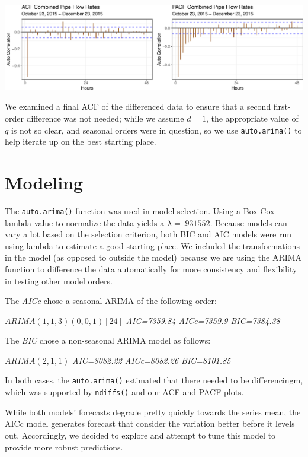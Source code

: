 \documentclass[openany]{book}
\begin{document}
\includegraphics{Group2_Project1_Fall2019_files/figure-latex/unnamed-chunk-18-1.pdf}

We examined a final ACF of the differenced data to ensure that a second
first-order difference was not needed; while we assume \(d = 1\), the
appropriate value of \(q\) is not so clear, and seasonal orders were in
question, so we use \texttt{auto.arima()} to help iterate up on the best
starting place.

\hypertarget{modeling-2}{%
\section{Modeling}\label{modeling-2}}

The \texttt{auto.arima()} function was used in model selection. Using a
Box-Cox lambda value to normalize the data yields a
\(\lambda= .931552\). Because models can vary a lot based on the
selection criterion, both BIC and AIC models were run using lambda to
estimate a good starting place. We included the transformations in the
model (as opposed to outside the model) because we are using the ARIMA
function to difference the data automatically for more consistency and
flexibility in testing other model orders.

The \emph{AICc} chose a seasonal ARIMA of the following order:

\(ARIMA(1,1,3)(0,0,1)[24]\) \emph{AIC=7359.84 AICc=7359.9 BIC=7384.38}

The \emph{BIC} chose a non-seasonal ARIMA model as follows:

\(ARIMA(2,1,1)\) \emph{AIC=8082.22 AICc=8082.26 BIC=8101.85}

In both cases, the \texttt{auto.arima()} estimated that there needed to
be differencingm, which was supported by \texttt{ndiffs()} and our ACF
and PACF plots.

While both models' forecasts degrade pretty quickly towards the series
mean, the AICc model generates forecast that consider the variation
better before it levels out. Accordingly, we decided to explore and
attempt to tune this model to provide more robust predictions.
\end{document}
